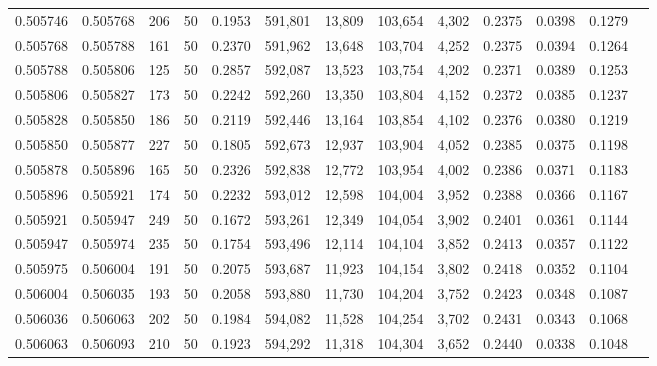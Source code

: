 \begin{tabular}{rrrrrrrrrrrrr}
0.505746 & 0.505768 & 206 &  50 &                                     0.1953 & 591,801 &  13,809 & 103,654 &   4,302 & 0.2375 & 0.0398 & 0.1279 \\
0.505768 & 0.505788 & 161 &  50 &                                     0.2370 & 591,962 &  13,648 & 103,704 &   4,252 & 0.2375 & 0.0394 & 0.1264 \\
0.505788 & 0.505806 & 125 &  50 &                                     0.2857 & 592,087 &  13,523 & 103,754 &   4,202 & 0.2371 & 0.0389 & 0.1253 \\
0.505806 & 0.505827 & 173 &  50 &                                     0.2242 & 592,260 &  13,350 & 103,804 &   4,152 & 0.2372 & 0.0385 & 0.1237 \\
0.505828 & 0.505850 & 186 &  50 &                                     0.2119 & 592,446 &  13,164 & 103,854 &   4,102 & 0.2376 & 0.0380 & 0.1219 \\
0.505850 & 0.505877 & 227 &  50 &                                     0.1805 & 592,673 &  12,937 & 103,904 &   4,052 & 0.2385 & 0.0375 & 0.1198 \\
0.505878 & 0.505896 & 165 &  50 &                                     0.2326 & 592,838 &  12,772 & 103,954 &   4,002 & 0.2386 & 0.0371 & 0.1183 \\
0.505896 & 0.505921 & 174 &  50 &                                     0.2232 & 593,012 &  12,598 & 104,004 &   3,952 & 0.2388 & 0.0366 & 0.1167 \\
0.505921 & 0.505947 & 249 &  50 &                                     0.1672 & 593,261 &  12,349 & 104,054 &   3,902 & 0.2401 & 0.0361 & 0.1144 \\
0.505947 & 0.505974 & 235 &  50 &                                     0.1754 & 593,496 &  12,114 & 104,104 &   3,852 & 0.2413 & 0.0357 & 0.1122 \\
0.505975 & 0.506004 & 191 &  50 &                                     0.2075 & 593,687 &  11,923 & 104,154 &   3,802 & 0.2418 & 0.0352 & 0.1104 \\
0.506004 & 0.506035 & 193 &  50 &                                     0.2058 & 593,880 &  11,730 & 104,204 &   3,752 & 0.2423 & 0.0348 & 0.1087 \\
0.506036 & 0.506063 & 202 &  50 &                                     0.1984 & 594,082 &  11,528 & 104,254 &   3,702 & 0.2431 & 0.0343 & 0.1068 \\
0.506063 & 0.506093 & 210 &  50 &                                     0.1923 & 594,292 &  11,318 & 104,304 &   3,652 & 0.2440 & 0.0338 & 0.1048 \\

\end{tabular}
